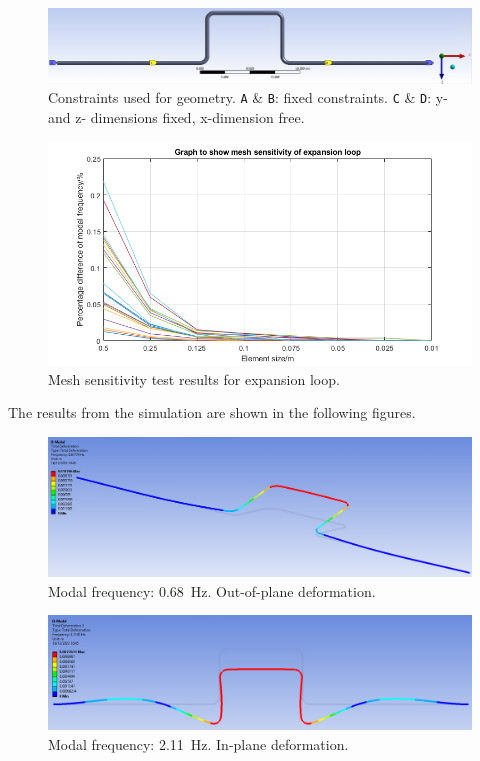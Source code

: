 \begin{figure}[H]
    \centering
    \includegraphics[width = \textwidth]{img/fig8.png}
    \caption{Constraints used for geometry. \texttt{A} \& \texttt{B}: fixed constraints. \texttt{C} \& \texttt{D}: y- and z- dimensions fixed, x-dimension free.}
    \label{constraints}
\end{figure}

\begin{figure}[H]
    \centering
    \includegraphics[width = 0.9 \textwidth]{img/fig10.png}
    \caption{Mesh sensitivity test results for expansion loop.}
    \label{mesh2}
\end{figure}

The results from the simulation are shown in the following figures.
\begin{figure}[H]
    \centering
    \includegraphics[width = 0.9 \textwidth]{img/fig11.png}
    \caption{Modal frequency: \SI{0.68}{\hertz}. Out-of-plane deformation.}
    \label{sim1}
\end{figure}

\begin{figure}[H]
    \centering
    \includegraphics[width = 0.9 \textwidth]{img/fig12.png}
    \caption{Modal frequency: \SI{2.11}{\hertz}. In-plane deformation.}
    \label{sim2}
\end{figure}

